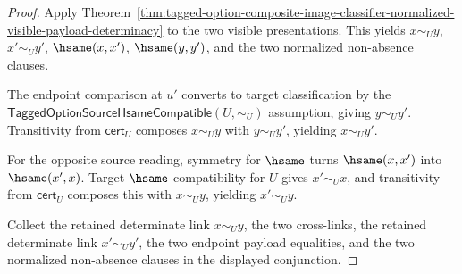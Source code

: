 \begin{proof}
Apply
Theorem~\ref{thm:tagged-option-composite-image-classifier-normalized-visible-payload-determinacy}
to the two visible presentations. This yields $x\sim_U y$, $x'\sim_U y'$,
$\hsame(x,x')$, $\hsame(y,y')$, and the two normalized non-absence clauses.

The endpoint comparison at $u'$ converts to target classification by the
$\mathsf{TaggedOptionSourceHsameCompatible}(U,\sim_U)$ assumption, giving
$y\sim_U y'$. Transitivity from $\mathsf{cert}_U$ composes $x\sim_U y$ with
$y\sim_U y'$, yielding $x\sim_U y'$.

For the opposite source reading, symmetry for $\hsame$ turns $\hsame(x,x')$
into $\hsame(x',x)$. Target $\hsame$ compatibility for $U$ gives
$x'\sim_U x$, and transitivity from $\mathsf{cert}_U$ composes this with
$x\sim_U y$, yielding $x'\sim_U y$.

Collect the retained determinate link $x\sim_U y$, the two cross-links, the
retained determinate link $x'\sim_U y'$, the two endpoint payload equalities,
and the two normalized non-absence clauses in the displayed conjunction.
\end{proof}


